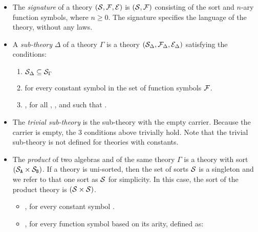 \begin{itemize}
    \item The \emph{signature} of a theory $(\mathcal{S}, \mathcal{F}, \mathcal{E})$ is $(\mathcal{S}, \mathcal{F})$ consisting of the sort and $n$-ary function symbols, where $n \geq 0$. The signature specifies the language of the theory, without any laws. 
    \item A \emph{sub-theory} $\Delta$ of a theory $\Gamma$ is a theory $(\mathcal{S}_\Delta, \mathcal{F}_\Delta,\mathcal{E}_\Delta)$ satisfying the conditions:  
    \begin{enumerate}
    \item $\mathcal{S}_\Delta \subseteq \mathcal{S}_\Gamma$ 
    \item {} \lstmath{=}  \lstmath{$\in \sort_\Delta$} for every constant symbol in the set of function symbols $\mathcal{F}$. 
    \item {} \lstmath{=}  \lstmath{$\in \sort_\Delta$}, for all , , and  such that . 
    \end{enumerate}
    \item The \emph{trivial sub-theory} is the sub-theory with the empty carrier. Because the carrier is empty, the $3$ conditions above trivially hold. Note that the trivial sub-theory is not defined for theories with constants.    
    \item The \emph{product} of two algebras  and  of the same theory $\Gamma$ is a theory with sort $(\mathcal{S}_\texttt{A} \times \mathcal{S}_\texttt{B})$. If a theory is uni-sorted, then the set of sorts $\mathcal{S}$ is a singleton and we refer to that one sort as $\mathcal{S}$ for simplicity. In this case, the sort of the product theory is $(\mathcal{S} \times \mathcal{S})$. 
    \begin{itemize}
    \item {}, for every constant symbol 
      . 
    \item {}, for every function symbol  based on its arity, defined as: \newline 

\end{itemize}
\end{itemize}

